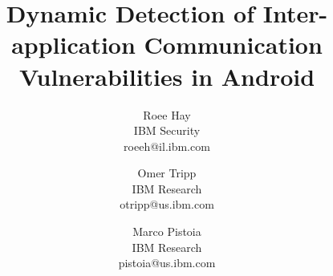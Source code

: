 \documentclass[pldi,nocopyrightspace]{sig-alternate}
\begin{document}
\title{Dynamic Detection of Inter-application Communication Vulnerabilities in Android}

\author{
		Roee Hay \\
		IBM Security \\
		\textsf{roeeh@il.ibm.com}
		\and
		Omer Tripp\\
		IBM Research \\
		\textsf{otripp@us.ibm.com}
		\and
		Marco Pistoia \\
		IBM Research \\
		\textsf{pistoia@us.ibm.com}
}

\maketitle













%

%



%





\newpage
\balance



\end{document}
